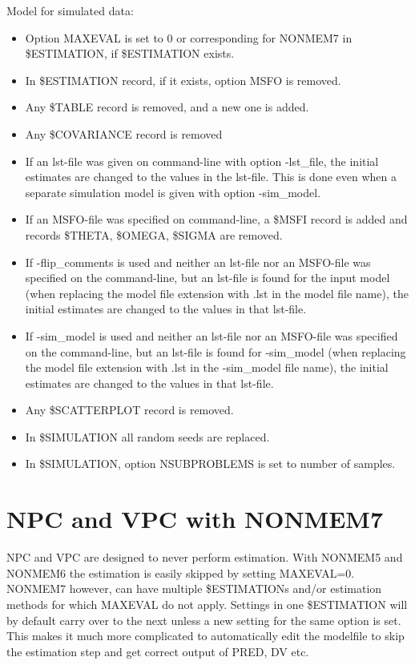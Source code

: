 Model for simulated data:
\begin{itemize}
	\item Option MAXEVAL is set to 0 or corresponding for  NONMEM7 in \$ESTIMATION, if \$ESTIMATION exists.
	\item In \$ESTIMATION record, if it exists, option MSFO is removed.
	\item Any \$TABLE record is removed, and a new one is added.
	\item Any \$COVARIANCE record is removed
	\item If an lst-file was given on command-line with option -lst\_file, 
the initial estimates are changed to the values in the lst-file. This is done even when a separate simulation model is given with option -sim\_model.
	\item If an MSFO-file was specified on command-line, a \$MSFI record is added and records \$THETA, \$OMEGA, \$SIGMA are removed.  
	\item If -flip\_comments is used and neither an lst-file nor an MSFO-file was specified on the command-line, 
but an lst-file is found for the input model (when replacing the model file extension 
with .lst in the model file name), 
the initial estimates are changed to the values in that lst-file.
	\item If -sim\_model is used and neither an lst-file nor an MSFO-file was specified on the command-line, 
but an lst-file is found for -sim\_model 
(when replacing the model file extension with .lst in the -sim\_model file name), 
the initial estimates are changed to the values in that lst-file.
	\item Any \$SCATTERPLOT record is removed.
	\item In \$SIMULATION all random seeds are replaced.      
	\item In \$SIMULATION, option NSUBPROBLEMS is set to number of samples.
\end{itemize}

\section{NPC and VPC with NONMEM7}
NPC and VPC are designed to never perform estimation. With NONMEM5 and NONMEM6 the estimation is easily skipped by setting MAXEVAL=0. NONMEM7 however,  can have multiple \$ESTIMATIONs and/or estimation methods for which MAXEVAL do not apply. Settings in one \$ESTIMATION will by default carry over to the next unless a new setting for the same option is set. This makes it much more complicated to automatically edit the modelfile to skip the estimation step and get correct output of PRED, DV etc. 

